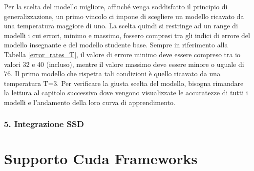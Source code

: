 Per la scelta del modello migliore, affinché venga soddisfatto il principio di generalizzazione, un primo vincolo ci impone di scegliere un modello ricavato da una temperatura maggiore di uno. La scelta quindi si restringe ad un range di modelli i cui errori, minimo e massimo, fossero compresi tra gli indici di errore del modello insegnante e del modello studente base. Sempre in riferimento alla Tabella \ref{error_rates_T}, il valore di errore minimo deve essere compreso tra io valori 32 e 40 (incluso), mentre il valore massimo deve essere minore o uguale di 76. Il primo modello che rispetta tali condizioni è quello ricavato da una temperatura T=3. Per verificare la giusta scelta del modello, bisogna rimandare la lettura al capitolo successivo dove vengono visualizzate le accuratezze di tutti i modelli e l'andamento della loro curva di apprendimento.

\subsubsection{5. Integrazione SSD}



\section{Supporto Cuda Frameworks}
